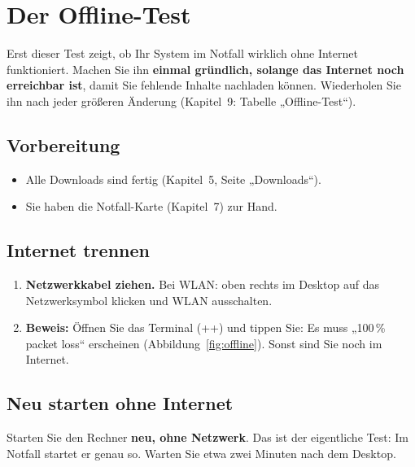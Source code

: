 \chapter{Der Offline-Test}

Erst dieser Test zeigt, ob Ihr System im Notfall wirklich ohne Internet funktioniert. Machen Sie ihn \textbf{einmal gründlich, solange das Internet noch erreichbar ist}, damit Sie fehlende Inhalte nachladen können. Wiederholen Sie ihn nach jeder größeren Änderung (Kapitel~9: Tabelle „Offline-Test“).

\section{Vorbereitung}
\begin{itemize}[leftmargin=1.5em,itemsep=3pt,label={\abhaken}]
\item Alle Downloads sind fertig (Kapitel~5, Seite „Downloads“).
\item Sie haben die Notfall-Karte (Kapitel~7) zur Hand.
\end{itemize}

\section{Internet trennen}
\begin{enumerate}[leftmargin=1.5em,itemsep=3pt]
\item \textbf{Netzwerkkabel ziehen.} Bei WLAN: oben rechts im Desktop auf das Netzwerksymbol klicken und WLAN ausschalten.
\item \textbf{Beweis:} Öffnen Sie das Terminal (++) und tippen Sie:
Es muss „100\,\% packet loss“ erscheinen (Abbildung~\ref{fig:offline}). Sonst sind Sie noch im Internet.
\end{enumerate}
\label{fig:offline}

\section{Neu starten ohne Internet}
Starten Sie den Rechner \textbf{neu, ohne Netzwerk}. Das ist der eigentliche Test: Im Notfall startet er genau so. Warten Sie etwa zwei Minuten nach dem Desktop.

